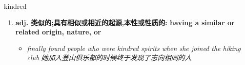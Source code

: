 
\begin{frame}
{\huge kindred}
\begin{center}
\begin{enumerate}\Large
  \item \textbf{adj. 类似的;具有相似或相近的起源,本性或性质的: having a similar or related origin, nature, or}
  \begin{itemize}
    \item \em{\Large{finally found people who were kindred spirits when she joined the hiking club 她加入登山俱乐部的时候终于发现了志向相同的人}}
  \end{itemize}
\end{enumerate}
\end{center}
\end{frame}
